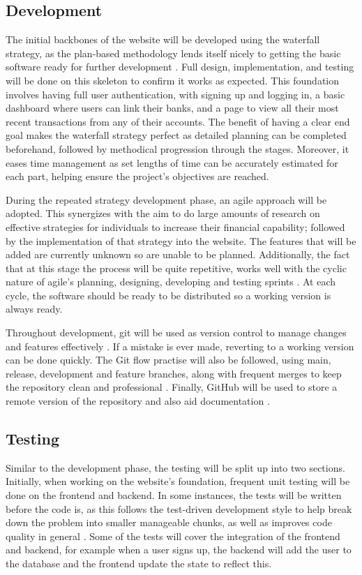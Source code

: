 \subsection{Development}
The initial backbones of the website will be developed using the waterfall strategy, as the plan-based methodology lends itself nicely to getting the basic software ready for further development \cite{WaterfallVsAgile}. Full design, implementation, and testing will be done on this skeleton to confirm it works as expected. This foundation involves having full user authentication, with signing up and logging in, a basic dashboard where users can link their banks, and a page to view all their most recent transactions from any of their accounts. The benefit of having a clear end goal makes the waterfall strategy perfect as detailed planning can be completed beforehand, followed by methodical progression through the stages. Moreover, it eases time management as set lengths of time can be accurately estimated for each part, helping ensure the project's objectives are reached.

During the repeated strategy development phase, an agile approach will be adopted. This synergizes with the aim to do large amounts of research on effective strategies for individuals to increase their financial capability; followed by the implementation of that strategy into the website. The features that will be added are currently unknown so are unable to be planned. Additionally, the fact that at this stage the process will be quite repetitive, works well with the cyclic nature of agile's planning, designing, developing and testing sprints \cite{WaterfallVsAgile}. At each cycle, the software should be ready to be distributed so a working version is always ready.

Throughout development, git will be used as version control to manage changes and features effectively \cite{Git}. If a mistake is ever made, reverting to a working version can be done quickly. The Git flow practise will also be followed, using main, release, development and feature branches, along with frequent merges to keep the repository clean and professional \cite{GitFlow}. Finally, GitHub will be used to store a remote version of the repository and also aid documentation \cite{GitHub}.

\subsection{Testing}
Similar to the development phase, the testing will be split up into two sections. Initially, when working on the website's foundation, frequent unit testing will be done on the frontend and backend. In some instances, the tests will be written before the code is, as this follows the test-driven development style to help break down the problem into smaller manageable chunks, as well as improves code quality in general \cite{TDD}. Some of the tests will cover the integration of the frontend and backend, for example when a user signs up, the backend will add the user to the database and the frontend update the state to reflect this.


